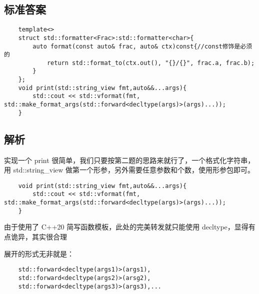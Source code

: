

\subsection{标准答案}

\begin{verbatim}
    template<>
    struct std::formatter<Frac>:std::formatter<char>{
        auto format(const auto& frac, auto& ctx)const{//const修饰是必须的
            return std::format_to(ctx.out(), "{}/{}", frac.a, frac.b);
        }
    };
    void print(std::string_view fmt,auto&&...args){
        std::cout << std::vformat(fmt, std::make_format_args(std::forward<decltype(args)>(args)...));
    }
\end{verbatim}

\subsection{解析}

实现一个 print 很简单，我们只要按第二题的思路来就行了，一个格式化字符串，用 std::string\_view 做第一个形参，另外需要任意参数和个数，使用形参包即可。

\begin{verbatim}
    void print(std::string_view fmt,auto&&...args){
        std::cout << std::vformat(fmt, std::make_format_args(std::forward<decltype(args)>(args)...));
    }
\end{verbatim}

由于使用了 C++20 简写函数模板，此处的完美转发就只能使用 decltype，显得有点诡异，其实很合理

展开的形式无非就是：

\begin{verbatim}
    std::forward<decltype(args1)>(args1),
    std::forward<decltype(args2)>(arsg2),
    std::forward<decltype(args3)>(args3),... 
\end{verbatim}

\clearpage
